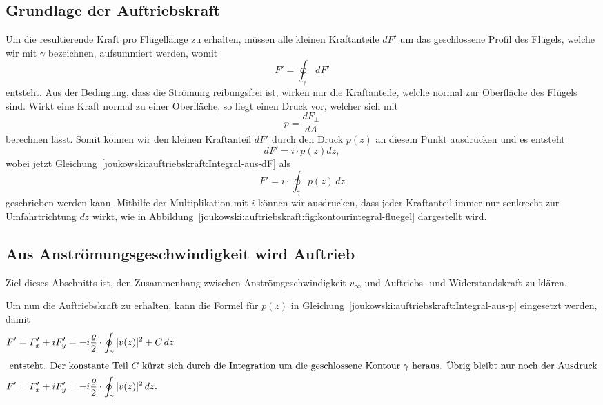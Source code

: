 \subsection{Grundlage der Auftriebskraft}
	Um die resultierende Kraft pro Flügellänge zu erhalten,	
	müssen alle kleinen Kraftanteile $dF'$ um das geschlossene Profil des Flügels,
	welche wir mit $\gamma$ bezeichnen,
	aufsummiert werden, womit
	\begin{equation}
		F'
		=
		\displaystyle\oint_{\gamma}
		\, dF'
		\label{joukowski:auftriebskraft:Integral-aus-dF}
	\end{equation}
	entsteht.
	Aus der Bedingung, dass die Strömung reibungsfrei ist,
	wirken nur die Kraftanteile,
	welche normal zur Oberfläche des Flügels sind.
	Wirkt eine Kraft normal zu einer Oberfläche,
	so liegt einen Druck vor, welcher sich mit
	\[
		p
		=
		\frac{dF_\perp}{dA}
	\]
	berechnen lässt.
	Somit können wir den kleinen Kraftanteil $dF'$ durch den Druck $p(z)$ an diesem Punkt ausdrücken
	und es entsteht
	\[
		dF'
		=
		i \cdot p(z) dz,
	\]
	wobei jetzt Gleichung~\eqref{joukowski:auftriebskraft:Integral-aus-dF} als
	\begin{equation}
		F'
		=
		i \cdot \displaystyle\oint_{\gamma}
		p(z)
		\, dz
		\label{joukowski:auftriebskraft:Integral-aus-p}
	\end{equation}
	geschrieben werden kann.
	Mithilfe der Multiplikation mit $i$ können wir ausdrucken,
	dass jeder Kraftanteil immer nur senkrecht zur Umfahrtrichtung $dz$ wirkt,
	wie in Abbildung~\ref{joukowski:auftriebskraft:fig:kontourintegral-fluegel} dargestellt wird.
	
	

\subsection{Aus Anströmungsgeschwindigkeit wird Auftrieb}
	Ziel dieses Abschnitts ist, den Zusammenhang zwischen Anströmgeschwindigkeit $v_\infty$ und Auftriebs- und Widerstandskraft zu klären.
	
	Um nun die Auftriebskraft zu erhalten,
	kann die Formel für $p(z)$ in Gleichung~\eqref{joukowski:auftriebskraft:Integral-aus-p} eingesetzt werden,
	damit
	\begin{align}
		&F'
		=
		F_x' + i F_y'
		=
		- i \frac{\varrho}{2} \cdot
		\displaystyle\oint_{\gamma}
		|v(z)|^2 + C \, dz 
		\notag
		\\
		\intertext{	entsteht.
					Der konstante Teil $C$ kürzt sich durch die Integration um die geschlossene Kontour $\gamma$ heraus.
					Übrig bleibt nur noch der Ausdruck}
		\label{joukowski:Auftriebskarft:Auftrieb1}
		&F'
		=
		F_x' + i F_y'
		=
		- i \frac{\varrho}{2} \cdot
		\displaystyle\oint_{\gamma}
		|v(z)|^2 \, dz.
	\end{align}

